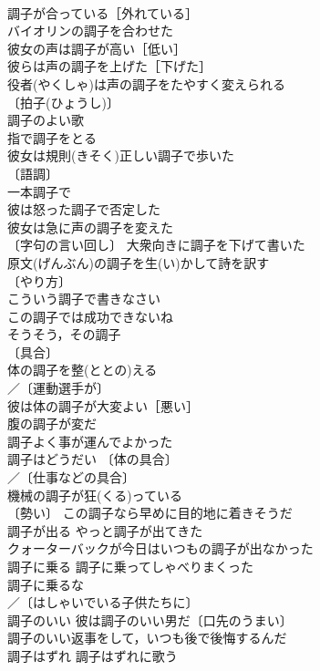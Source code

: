 \documentclass[8pt]{extreport}
\begin{document}
\begin{CJK}{UTF8}{min}
\\	調子が合っている［外れている］ 
\\	バイオリンの調子を合わせた 
\\	彼女の声は調子が高い［低い］ 
\\	彼らは声の調子を上げた［下げた］ 
\\	役者(やくしゃ)は声の調子をたやすく変えられる 
\\	〔拍子(ひょうし)〕
\\	調子のよい歌 
\\	指で調子をとる 
\\	彼女は規則(きそく)正しい調子で歩いた 
\\	〔語調〕
\\	一本調子で 
\\	彼は怒った調子で否定した 
\\	彼女は急に声の調子を変えた 
\\	〔字句の言い回し〕 大衆向きに調子を下げて書いた 
\\	原文(げんぶん)の調子を生(い)かして詩を訳す 
\\	〔やり方〕
\\	こういう調子で書きなさい 
\\	この調子では成功できないね 
\\	そうそう，その調子 
\\	〔具合〕
\\	体の調子を整(ととの)える 
\\	／〔運動選手が〕
\\	彼は体の調子が大変よい［悪い］ 
\\	腹の調子が変だ 
\\	調子よく事が運んでよかった 
\\	調子はどうだい 〔体の具合〕
\\	／〔仕事などの具合〕
\\	機械の調子が狂(くる)っている 
\\	〔勢い〕 この調子なら早めに目的地に着きそうだ 
\\	調子が出る やっと調子が出てきた 
\\	クォーターバックが今日はいつもの調子が出なかった 
\\	調子に乗る 調子に乗ってしゃべりまくった 
\\	調子に乗るな 
\\	／〔はしゃいでいる子供たちに〕
\\	調子のいい 彼は調子のいい男だ〔口先のうまい〕 
\\	調子のいい返事をして，いつも後で後悔するんだ 
\\	調子はずれ 調子はずれに歌う 

\end{CJK}
\end{document}
